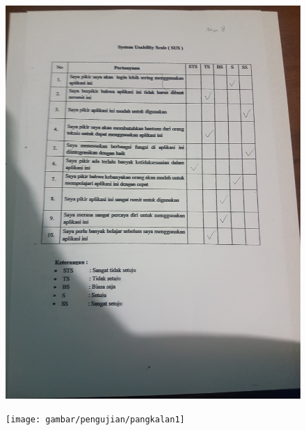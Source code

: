 \begin{figure}[H]
	\center
	\includegraphics [width = 17cm,angle=-90]{gambar/pengujian/agen8}
\end{figure}

\begin{figure}[H]
	\center
	\texttt{[image: gambar/pengujian/pangkalan1]}
\end{figure}

